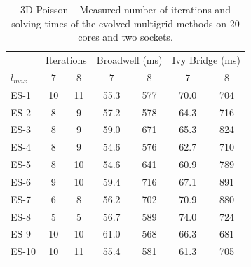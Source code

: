 \begin{table}
	\caption{3D Poisson -- Measured number of iterations and solving times of the evolved multigrid methods on 20 cores and two sockets.}
	\label{table:poisson-3D-evolved-methods}
	\centering
	\begin{tabular}{l c c c c c c}
		\toprule
		& \multicolumn{2}{c}{Iterations} & \multicolumn{2}{c}{Broadwell (ms)} & \multicolumn{2}{c}{Ivy Bridge (ms)} \\
		\cmidrule(r){2-3} \cmidrule(r){4-5} \cmidrule(r){6-7}
		$l_{max}$ & $7$& $8$ & $7$ & $8$ & $7$ & $8$\\
		\midrule
		ES-1 & 10 & 11 & 55.3 & 577 & 70.0 & 704\\
		\midrule
		ES-2 & 8 & 9 & 57.2 & 578 & 64.3 & 716 \\
		\midrule
		ES-3 & 8 & 9 & 59.0 & 671 & 65.3 & 824 \\
		\midrule
		ES-4 & 8 & 9 & 54.6 & 576 & 62.7 & 710 \\
		\midrule
		ES-5 & 8 & 10 & 54.6 & 641 & 60.9 & 789 \\
		\midrule
		ES-6 & 9 & 10 & 59.4 & 716 & 67.1 & 891 \\
		\midrule
		ES-7 & 6 & 8 & 56.2 & 702 & 70.9 & 880 \\
		\midrule
		ES-8 & 5 & 5 & 56.7 & 589 & 74.0 & 724 \\
		\midrule
		ES-9 & 10 & 10 & 61.0 & 568 & 66.3 & 681 \\
		\midrule
		ES-10 & 10 & 11 & 55.4 & 581 & 61.3 & 705 \\
		\bottomrule
	\end{tabular}
\end{table}
